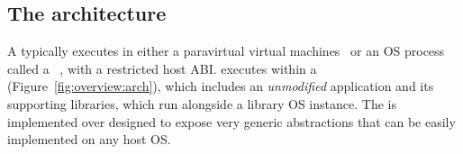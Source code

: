 \subsection{The \graphene{} architecture}
\label{sec:overview:libos:arch}

A \libos{} typically executes in either a paravirtual virtual machines~\cite{unikernels,osv}
or an OS process called a \emph{\picoproc{}}~\cite{porter11drawbridge,baumann13bascule}, with a restricted host ABI.
\graphene{} executes within a \picoproc{} (Figure~\ref{fig:overview:arch}),
which includes an {\em unmodified} application and its supporting libraries, which run alongside a library OS instance.
The \libos{} is implemented over \thehostabi{} designed to expose very generic abstractions that can be easily implemented on any host OS.


